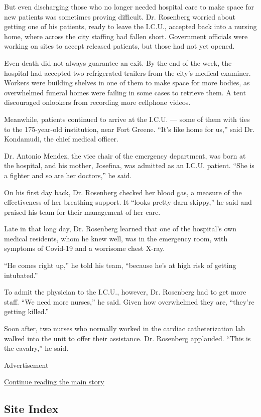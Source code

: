 But even discharging those who no longer needed hospital care to make
space for new patients was sometimes proving difficult. Dr. Rosenberg
worried about getting one of his patients, ready to leave the I.C.U.,
accepted back into a nursing home, where across the city staffing had
fallen short. Government officials were working on sites to accept
released patients, but those had not yet opened.

Even death did not always guarantee an exit. By the end of the week, the
hospital had accepted two refrigerated trailers from the city's medical
examiner. Workers were building shelves in one of them to make space for
more bodies, as overwhelmed funeral homes were failing in some cases to
retrieve them. A tent discouraged onlookers from recording more
cellphone videos.

Meanwhile, patients continued to arrive at the I.C.U. --- some of them
with ties to the 175-year-old institution, near Fort Greene. ``It's like
home for us,'' said Dr. Kondamudi, the chief medical officer.

Dr. Antonio Mendez, the vice chair of the emergency department, was born
at the hospital, and his mother, Josefina, was admitted as an I.C.U.
patient. ``She is a fighter and so are her doctors,'' he said.

On his first day back, Dr. Rosenberg checked her blood gas, a measure of
the effectiveness of her breathing support. It ``looks pretty darn
skippy,'' he said and praised his team for their management of her care.

Late in that long day, Dr. Rosenberg learned that one of the hospital's
own medical residents, whom he knew well, was in the emergency room,
with symptoms of Covid-19 and a worrisome chest X-ray.

``He comes right up,'' he told his team, ``because he's at high risk of
getting intubated.''

To admit the physician to the I.C.U., however, Dr. Rosenberg had to get
more staff. ``We need more nurses,'' he said. Given how overwhelmed they
are, ``they're getting killed.''

Soon after, two nurses who normally worked in the cardiac
catheterization lab walked into the unit to offer their assistance. Dr.
Rosenberg applauded. ``This is the cavalry,'' he said.

Advertisement

\protect\hyperlink{after-bottom}{Continue reading the main story}

\hypertarget{site-index}{%
\subsection{Site Index}\label{site-index}}

